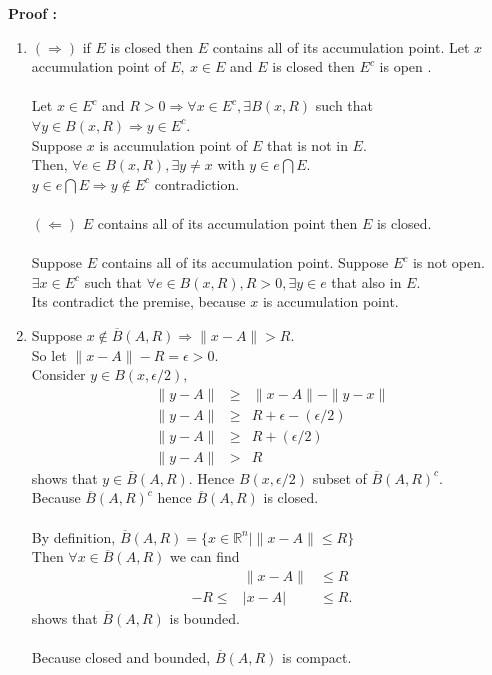\documentclass[a4paper,10pt]{article}
\newcommand{\R}{\mathbb{R}}
\begin{document}
\textbf{Proof :}
\begin{enumerate}
	\item $ (\Rightarrow) $ if $ E $ is closed then $ E $ contains all of its accumulation point. Let $ x $ accumulation point of $ E, \ x \in E $ and $ E $ is closed then $ E^{c} $ is open . \\ \\ 
	Let $ x \in E^{c} $ and $ R>0 \Rightarrow \forall x\in E^{c}, \exists B(x,R) $ such that $ \forall y \in B(x,R) \Rightarrow y \in E^{c} $.\\
	Suppose $ x $ is accumulation point of $ E $ that is not in $ E $.\\
	 Then, $ \forall e \in B(x,R), \exists y \neq x $ with $ y\in e \bigcap E $. \\
	$ y\in e\bigcap E \Rightarrow y \notin E^{c} $ contradiction.\\ \\
	$ (\Leftarrow) $ $ E $ contains all of its accumulation point then $ E $ is closed. \\ \\
	Suppose $ E $ contains all of its accumulation point. Suppose $ E^{c} $ is not open. \\
	$ \exists x \in E^{c} $ such that $ \forall e \in B(x,R), R>0, \exists y \in e $ that also in $ E $.\\
	Its contradict the premise, because $ x $ is accumulation point.
	\item Suppose $ x \notin \overline{B}(A,R) \Rightarrow \|x-A\| >R $.\\
	So let $ \|x-A\| -R = \epsilon >0 $. \\
	Consider $ y \in B(x, \epsilon/2) $,
	\begin{eqnarray} \nonumber
	\|y-A\| &\geq& \|x-A\| -\|y-x\| \\ \nonumber
	\|y-A\| &\geq& R + \epsilon - (\epsilon/2) \\ \nonumber
	\|y-A\| &\geq& R + (\epsilon/2) \\ \nonumber
	\|y-A\| &>& R
	\end{eqnarray}
	shows that $ y \in \overline{B}(A,R) $. Hence $ B(x, \epsilon/2) $ subset of $ \overline{B}(A,R)^{c} $.\\
	Because $ \overline{B}(A,R)^{c} $ hence $ \overline{B}(A,R) $ is closed. \\ \\
	By definition, $ \overline{B}(A,R) = \{ x\in \R^n | \|x-A\| \leq R \}$\\
	Then $ \forall x \in \overline{B}(A,R) $ we can find
	\begin{eqnarray}\nonumber
	&\|x-A\|& \leq R\\
	-R \leq&|x-A|& \leq R.
	\end{eqnarray}
	shows that $ \overline{B}(A,R) $ is bounded.\\ \\
	Because closed and bounded, $ \overline{B}(A,R) $ is compact.
\end{enumerate}
\end{document}
